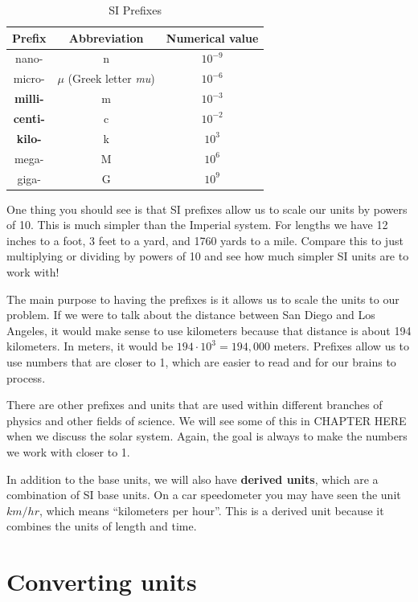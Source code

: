 \documentclass[12pt]{book}
\begin{document}
\begin{table}[b]
\centering
\caption{SI Prefixes}
\begin{tabular}{ c | c | c }
	\hline
	Prefix & Abbreviation & Numerical value \\
	\hline
	nano- & n & $10^{-9}$ \\
	micro- & $\mu$ (Greek letter \textit{mu}) & $10^{-6}$ \\
	\textbf{milli-} & m & $10^{-3}$ \\
	\textbf{centi-} & c & $10^{-2}$ \\
	\textbf{kilo-} & k & $10^3$ \\
	mega- & M & $10^6$ \\
	giga- & G & $10^9$ \\
	\hline
\end{tabular}

\label{SIPrefixes}
\end{table}

One thing you should see is that SI prefixes allow us to scale our units by powers of 10. This is much simpler than the Imperial system. For lengths we have 12 inches to a foot, 3 feet to a yard, and 1760 yards to a mile. Compare this to just multiplying or dividing by powers of 10 and see how much simpler SI units are to work with!

The main purpose to having the prefixes is it allows us to scale the units to our problem. If we were to talk about the distance between San Diego and Los Angeles, it would make sense to use kilometers because that distance is about 194 kilometers. In meters, it would be $194 \cdot 10^3 = 194,000$ meters. Prefixes allow us to use numbers that are closer to 1, which are easier to read and for our brains to process. 

There are other prefixes and units that are used within different branches of physics and other fields of science. We will see some of this in CHAPTER HERE when we discuss the solar system. Again, the goal is always to make the numbers we work with closer to 1.

In addition to the base units, we will also have \textbf{derived units}, which are a combination of SI base units. On a car speedometer you may have seen the unit $km/hr$, which means ``kilometers per hour''. This is a derived unit because it combines the units of length and time.


\section{Converting units}
\end{document}
